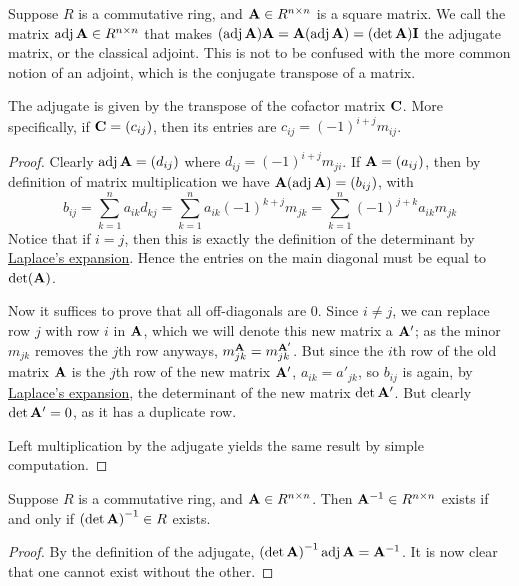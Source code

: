 \begin{definition}
    Suppose \(R\) is a commutative ring,
    and \(\vb{A} \in R^{n \times n}\) is a square matrix.
    We call the matrix \(\operatorname{adj}\vb{A} \in R^{n \times n}\)
    that makes \((\operatorname{adj}\vb{A})\vb{A} = \vb{A}(\operatorname{adj}\vb{A}) = (\det\vb{A})\vb{I}\)
    the adjugate matrix, or the classical adjoint.
    This is not to be confused with the more common notion of an adjoint,
    which is the conjugate transpose of a matrix.
\end{definition}
\begin{proposition}
    The adjugate is given by the transpose of the cofactor matrix \(\vb{C}\).
    More specifically, if \(\vb{C} = (c_{ij})\),
    then its entries are \(c_{ij} = {(-1)}^{i+j}m_{ij}\).
\end{proposition}
\begin{proof}
    Clearly \(\operatorname{adj}\vb{A} = (d_{ij})\)
    where \(d_{ij} = {(-1)}^{i+j}m_{ji}\).
    If \(\vb{A} = (a_{ij})\),
    then by definition of matrix multiplication we have
    \(\vb{A}(\operatorname{adj}\vb{A}) = (b_{ij})\), with
    \begin{equation*}
        b_{ij} = \sum_{k=1}^n a_{ik}d_{kj}
        = \sum_{k=1}^n a_{ik} {(-1)}^{k+j}m_{jk}
        = \sum_{k=1}^n {(-1)}^{j+k} a_{ik}m_{jk}
    \end{equation*}
    Notice that if \(i=j\),
    then this is exactly the definition of the determinant
    by \hyperref[thm:laplace-expansion-det]{Laplace's expansion}.
    Hence the entries on the main diagonal must be equal to \(\det(\vb{A})\).
    
    Now it suffices to prove that all off-diagonals are 0.
    Since \(i \neq j\), we can replace row \(j\) with row \(i\) in \(\vb{A}\),
    which we will denote this new matrix a \(\vb{A'}\);
    as the minor \(m_{jk}\) removes the \(j\)th row anyways,
    \(m_{jk}^{\vb{A}} = m_{jk}^{\vb{A'}}\).
    But since the \(i\)th row of the old matrix \(\vb{A}\)
    is the \(j\)th row of the new matrix \(\vb{A'}\),
    \(a_{ik} = a'_{jk}\), so \(b_{ij}\) is again,
    by \hyperref[thm:laplace-expansion-det]{Laplace's expansion},
    the determinant of the new matrix \(\det\vb{A'}\).
    But clearly \(\det\vb{A'} = 0\),
    as it has a duplicate row.

    Left multiplication by the adjugate yields the same result
    by simple computation.
\end{proof}

\begin{theorem}
    Suppose \(R\) is a commutative ring,
    and \(\vb{A} \in R^{n \times n}\).
    Then \(\vb{A}^{-1} \in R^{n \times n}\) exists
    if and only if \({(\det\vb{A})}^{-1} \in R\) exists.
\end{theorem}
\begin{proof}
    By the definition of the adjugate,
    \({(\det\vb{A})}^{-1} \operatorname{adj}\vb{A} = \vb{A}^{-1}\).
    It is now clear that one cannot exist without the other.
\end{proof}

